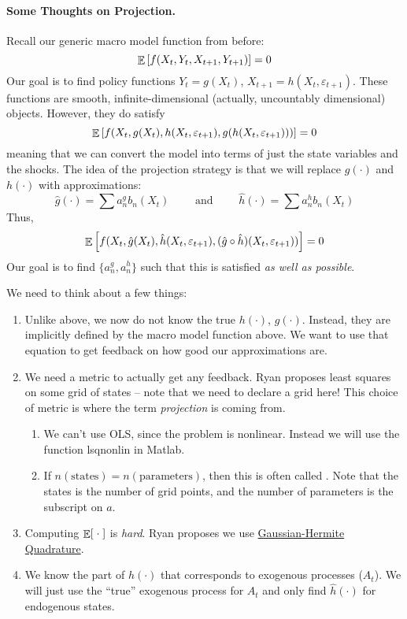 \documentclass[10pt]{article}
\begin{document}
\paragraph{Some Thoughts on Projection.}

Recall our generic macro model function from before:
\[
\mathop{\mathbb{E}}\left[ f(X_t,Y_t,X_{t+1},Y_{t+1})\right] = 0
\]
Our goal is to find policy functions $Y_t = g(X_t)$, $X_{t+1} = h(X_t, \varepsilon_{t+1})$. These functions are smooth, infinite-dimensional (actually, uncountably dimensional) objects. However, they do satisfy
\[
\mathop{\mathbb{E}}\left[ f(X_t,g(X_t),h(X_t,\varepsilon_{t+1}),g(h(X_t,\varepsilon_{t+1})))\right] = 0
\]
meaning that we can convert the model into terms of just the state variables and the shocks. The idea of the projection strategy is that we will replace $g(\cdot)$ and $h(\cdot)$ with approximations:
\[
\hat{g}(\cdot) = \sum a_n^g b_n(X_t) \qquad \text{ and } \qquad \hat{h}(\cdot) = \sum a_n^h b_n(X_t)
\]
Thus,
\[
\mathop{\mathbb{E}}\left[ f(X_t,\hat{g}(X_t),\hat{h}(X_t,\varepsilon_{t+1}),(\hat{g} \circ \hat{h})(X_t,\varepsilon_{t+1}))\right] = 0
\]
Our goal is to find $\{a_n^g,a_n^h\}$ such that this is satisfied \emph{as well as possible}.

We need to think about a few things:
\begin{enumerate}
	\item Unlike above, we now do not know the true $h(\cdot)$, $g(\cdot)$. Instead, they are implicitly defined by the macro model function above. We want to use that equation to get feedback on how good our approximations are.
	\item We need a metric to actually get any feedback. Ryan proposes least squares on some grid of states -- note that we need to declare a grid here! This choice of metric is where the term \emph{projection} is coming from.
	\begin{enumerate}
		\item We can't use OLS, since the problem is nonlinear. Instead we will use the function lsqnonlin in Matlab.
		\item If $n(\text{states}) = n(\text{parameters})$, then this is often called . Note that the states is the number of grid points, and the number of parameters is the subscript on $a$.
	\end{enumerate}
	\item Computing $\mathop{\mathbb{E}}[ \;\cdot\; ]$ is \emph{hard}. Ryan proposes we use \href{https://en.wikipedia.org/wiki/Gauss\%E2\%80\%93Hermite_quadrature}{Gaussian-Hermite Quadrature}.
	\item We know the part of $h(\cdot)$ that corresponds to exogenous processes (\eg $A_t$). We will just use the ``true'' exogenous process for $A_t$ and only find $\hat{h}(\cdot)$ for endogenous states.
\end{enumerate}
\end{document}

